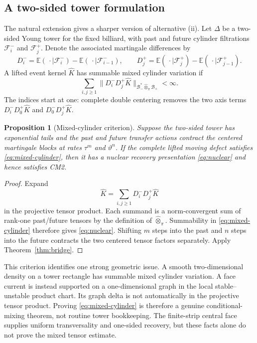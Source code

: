 \documentclass[11pt]{article}
\newtheorem{proposition}[theorem]{Proposition}
\begin{document}
\subsection{A two-sided tower formulation}

The natural extension gives a sharper version of alternative (ii).  Let
$\Delta$ be a two-sided Young tower for the fixed billiard, with past and
future cylinder filtrations $\mathcal F_i^-$ and $\mathcal F_j^+$.  Denote
the associated martingale differences by
\[
 D_i^-=\mathbb E(\,\cdot\mid\mathcal F_i^-)
       -\mathbb E(\,\cdot\mid\mathcal F_{i-1}^-),
 \qquad
 D_j^+=\mathbb E(\,\cdot\mid\mathcal F_j^+)
       -\mathbb E(\,\cdot\mid\mathcal F_{j-1}^+).
\]
A lifted event kernel $\widehat K$ has summable mixed cylinder variation if
\begin{equation}
\label{eq:mixed-cylinder}
 \sum_{i,j\ge1}
 \|D_i^-D_j^+\widehat K\|_{\mathcal B_-^*\widehat\otimes_\pi
                                      \mathcal B_+}<\infty.
\end{equation}
The indices start at one: complete double centering removes the two axis
terms $D_i^-D_0^+\widehat K$ and $D_0^-D_j^+\widehat K$.

\begin{proposition}[Mixed-cylinder criterion]
\label{prop:mixed-cylinder}
Suppose the two-sided tower has exponential tails and the past and future
transfer actions contract the centered martingale blocks at rates
$\tau^m$ and $\vartheta^n$.  If the complete lifted moving defect satisfies
\eqref{eq:mixed-cylinder}, then it has a nuclear recovery presentation
\eqref{eq:nuclear} and hence satisfies CM2.
\end{proposition}

\begin{proof}
Expand
\[
 \widehat K=\sum_{i,j\ge1}D_i^-D_j^+\widehat K
\]
in the projective tensor product.  Each summand is a norm-convergent sum of
rank-one past/future tensors by the definition of
$\widehat\otimes_\pi$.  Summability in \eqref{eq:mixed-cylinder} therefore
gives \eqref{eq:nuclear}.  Shifting $m$ steps into the past and $n$ steps into
the future contracts the two centered tensor factors separately.  Apply
Theorem~\ref{thm:bridge}.
\end{proof}

This criterion identifies one strong geometric issue.  A smooth two-dimensional
density on a tower rectangle has summable mixed cylinder variation.  A face
current is instead supported on a one-dimensional graph in the local
stable--unstable product chart.  Its graph delta is not automatically in the
projective tensor product.  Proving \eqref{eq:mixed-cylinder} is therefore a
genuine conditional-mixing theorem, not routine tower bookkeeping.  The
finite-strip central face supplies uniform transversality and one-sided
recovery, but these facts alone do not prove the mixed tensor estimate.
\end{document}
